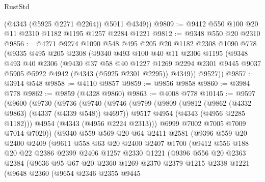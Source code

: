 \begin{lexlean}{RustStd}
\begin{coremodule}
        (@4343 (@5925 @2271 @2264))
        @5011
        @4349))
@9809 := @9412 @550 @100 @20 @11 @2310 @1182 @1195 @1257 @2284 @1221
@9812 := @9348 @550 @20 @2310
@9856 := @4271
    @9274
    @1090
    @548
    @495
    @205
    @20
    @1182
    @2308
    @1090
    @778
    (@9335
      @495
      @205
      @2308
      (@9340
        @493
        @100
        @40
        @11
        @2306
        @1195
        (@9348
          @493
          @40
          @2306
          (@9430
            @37
            @58
            @40
            @1227
            @1269
            @2294
            @2301
            @9445
            @9037
            @5905
            @5922
            @4942
            (@4343 (@5925 @2301 @2295))
            @4349))
        @9527))
@9857 := @3914 @548
@9858 := @4110 @9857
@9859 := @9856 @9858
@9860 := @3984 @778
@9862 := @9859 (@4328 @9860)
@9863 := @4008 @778
@10145 := @9597
    (@9600
      (@9730
        (@9736
          (@9740
            (@9746
              (@9799
                (@9809
                  (@9812 (@9862 (@4332 @9863) (@4337 (@4339 @548)) @4697))
                  @9517
                  @4954
                  (@4343 (@4956 @2285 @1182)))
                @4954
                (@4343 (@4956 @2224 @2313)))
              @6999
              @7002
              @7005
              @7009
              @7014
              @7020))
          (@9340
            @559
            @569
            @20
            @64
            @2411
            @2581
            (@9396
              @559
              @20
              @2400
              @2409
              (@9611
                @558
                @63
                @20
                @2400
                @2407
                @1700
                (@9412
                  @556
                  @188
                  @20
                  @22
                  @2386
                  @2399
                  @2406
                  @1257
                  @2330
                  @1221
                  (@9396
                    @556
                    @20
                    @2363
                    @2384
                    (@9636
                      @95
                      @67
                      @20
                      @2360
                      @1269
                      @2370
                      @2379
                      @1215
                      @2338
                      @1221
                      (@9648
                        @2360
                        (@9654
                          @2346
                          @2355
                          @9445

\end{coremodule}
\end{lexlean}
